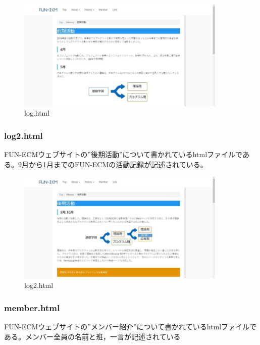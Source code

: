 \documentclass[openany,11pt,papersize]{jsbook}
\begin{document}
\begin{figure}[H]
  \begin{center} %
    \includegraphics[clip, width=10.0cm]{./figure/log.png}
    \caption{log.html} %
    \label{log} %
  \end{center}
\end{figure}

\subsubsection{log2.html}
FUN-ECMウェブサイトの”後期活動”について書かれているhtmlファイルである。9月から1月までのFUN-ECMの活動記録が記述されている。

\begin{figure}[H]
  \begin{center} %
    \includegraphics[clip, width=10.0cm]{./figure/log2.png}
    \caption{log2.html} %
    \label{log2} %
  \end{center}
\end{figure}

\subsubsection{member.html}
FUN-ECMウェブサイトの”メンバー紹介”について書かれているhtmlファイルである。メンバー全員の名前と班，一言が記述されている
\end{document}
